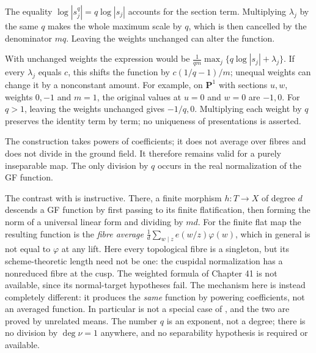 \begin{remark}
\label{rem:ch43-weights-times-q}
The equality $\log|s_j^q|=q\log|s_j|$ accounts for the section term.
Multiplying $\lambda_j$ by the same $q$ makes the whole maximum scale by
$q$, which is then cancelled by the denominator $mq$.
Leaving the weights unchanged can alter the function.

With unchanged weights the expression would be
$\frac1{qm}\max_j\{q\log|s_j|+\lambda_j\}$.
If every $\lambda_j$ equals $c$, this shifts the function by
$c(1/q-1)/m$; unequal weights can change it by a nonconstant amount.
For example, on $\mathbf P^1$ with sections $u,w$, weights $0,-1$
and $m=1$, the original values at $u=0$ and $w=0$ are $-1,0$.
For $q>1$, leaving the weights unchanged gives $-1/q,0$.
Multiplying each weight by $q$ preserves the identity term by term;
no uniqueness of presentations is asserted.
\end{remark}

\begin{remark}[No averaging]
\label{rem:ch43-no-averaging}
The construction takes powers of coefficients; it does not average over
fibres and does not divide in the ground field.
It therefore remains valid for a purely inseparable map.
The only division by $q$ occurs in the real normalization of the GF
function.

The contrast with  is instructive.  There, a
finite morphism $h:T\to X$ of degree $d$ descends a GF function by
first passing to its finite flatification, then forming the norm of
a universal linear form and dividing by $md$.  For the finite flat
map the resulting function is the \emph{fibre average}
$\frac1d\sum_{w\mid z}e(w/z)\varphi(w)$, which in general is not equal to
$\varphi$ at any lift.  Here every topological fibre is a singleton, but
its scheme-theoretic length need not be one: the cuspidal normalization has
a nonreduced fibre at the cusp.  The weighted formula of Chapter 41 is not
available, since its normal-target hypotheses fail.  The mechanism here is
instead completely different: it produces the \emph{same} function by
powering coefficients, not an averaged function.  In particular
 is not a special case of
, and the two are proved by
unrelated means.  The number $q$ is an exponent, not a degree; there is no
division by $\deg\nu=1$ anywhere, and no separability hypothesis is
required or available.
\end{remark}

